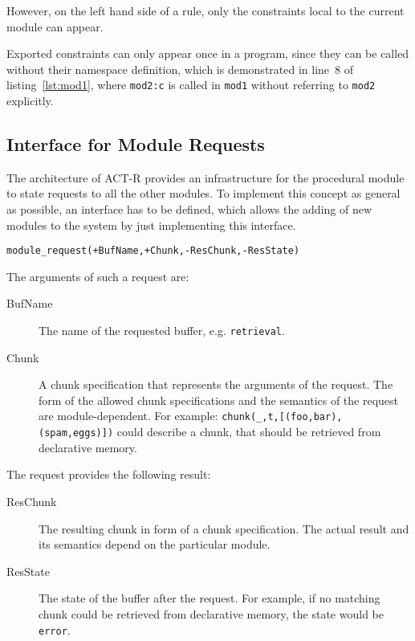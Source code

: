 \begin{example}
However, on the left hand side of a rule, only the constraints local to the current module can appear. 

Exported constraints can only appear once in a program, since they can be called without their namespace definition, which is demonstrated in line~8 of listing~\ref{lst:mod1}, where \lstinline|mod2:c| is called in \lstinline|mod1| without referring to \lstinline|mod2| explicitly.
\end{example}

\subsection{Interface for Module Requests}
\label{interface_for_module_requests}

The architecture of ACT-R provides an infrastructure for the procedural module to state requests to all the other modules. To implement this concept as general as possible, an interface has to be defined, which allows the adding of new modules to the system by just implementing this interface.

\begin{lstlisting}[caption={Simple Interface ``Module''},label=lst:interface_module]
module_request(+BufName,+Chunk,-ResChunk,-ResState)
\end{lstlisting}

The arguments of such a request are:

\begin{description}
 \item[BufName] The name of the requested buffer, e.g. \lstinline|retrieval|.
 \item[Chunk] A chunk specification that represents the arguments of the request. The form of the allowed chunk specifications and the semantics of the request are module-dependent. For example: \lstinline|chunk(_,t,[(foo,bar),(spam,eggs)])| could describe a chunk, that should be retrieved from declarative memory.
\end{description}

The request provides the following result:

\begin{description}
 \item[ResChunk] The resulting chunk in form of a chunk specification. The actual result and its semantics depend on the particular module.
 \item[ResState] The state of the buffer after the request. For example, if no matching chunk could be retrieved from declarative memory, the state would be \lstinline|error|.
\end{description}

